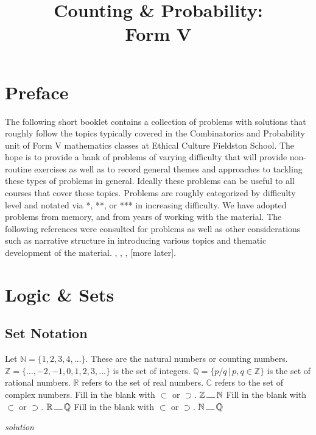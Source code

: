 \documentclass{amsbook}
\begin{document}
\title{Counting \& Probability:\\
    \Large Form V}


\maketitle
\tableofcontents
\chapter*{Preface}
The following short booklet contains a collection of problems with solutions that roughly follow the topics typically covered in the Combinatorics and Probability unit of Form V mathematics classes at Ethical Culture Fieldston School. The hope is to provide a bank of problems of varying difficulty that will provide non-routine exercises as well as to record general themes and approaches to tackling these types of problems in general. Ideally these problems can be useful to all courses that cover these topics. Problems are roughly categorized by difficulty level and notated via *, **, or *** in increasing difficulty. We have adopted problems from memory, and from years of working with the material. The following references were consulted for problems as well as other considerations such as narrative structure in introducing various topics and thematic development of the material. \cite{mcirc}, \cite{aops}, \cite{hpn}, [more later].
\chapter{Logic \& Sets}

\section{Set Notation}

\begin{Exercise}[title={A few well known sets}, difficulty=0, label=s1]
Let $\mathbb{N}=\{1,2,3,4,\ldots\}$. These are the natural numbers or counting numbers. $\mathbb{Z}=\{\ldots, -2, -1, 0, 1, 2,3,\ldots\}$ is the set of integers. $\mathbb{Q}=\{p/q \, \big| \, p, q \in \mathbb{Z}\}$ is the set of rational numbers. $\mathbb{R}$ refers to the set of real numbers. $\mathbb{C}$ refers to the set of complex numbers.
    \Question Fill in the blank with $\subset$ or $\supset$. \quad $\mathbb{Z} \, \makebox[1em]{\hrulefill}\, \mathbb{N}$
    \Question Fill in the blank with $\subset$ or $\supset$. \quad $\mathbb{R} \, \makebox[1em]{\hrulefill} \, \mathbb{Q}$
    \Question Fill in the blank with $\subset$ or $\supset$. \quad $\mathbb{N} \, \makebox[1em]{\hrulefill} \, \mathbb{Q}$
    
    \hfill \emph{solution} 
\end{Exercise}
\end{document}
